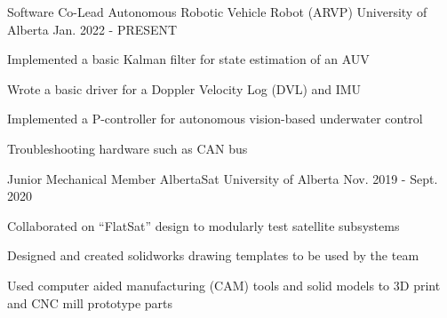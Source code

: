 

\begin{cventries}

  \cventry
    {Software Co-Lead} %
    {Autonomous Robotic Vehicle Robot (ARVP)} %
    {University of Alberta} %
    {Jan. 2022 - PRESENT} %
    {
      \begin{cvitems} %
        \item Implemented a basic Kalman filter for state estimation of an AUV
        \item Wrote a basic driver for a Doppler Velocity Log (DVL) and IMU
        \item Implemented a P-controller for autonomous vision-based underwater control
        \item Troubleshooting hardware such as CAN bus
      \end{cvitems}
    }

  \cventry
    {Junior Mechanical Member} %
    {AlbertaSat} %
    {University of Alberta} %
    {Nov. 2019 - Sept. 2020} %
    {
      \begin{cvitems} %
        \item Collaborated on ``FlatSat'' design to modularly test satellite subsystems
        \item Designed and created solidworks drawing templates to be used by the team
        \item Used computer aided manufacturing (CAM) tools and solid models to 3D print and CNC mill prototype parts
      \end{cvitems}
    }

\end{cventries}
